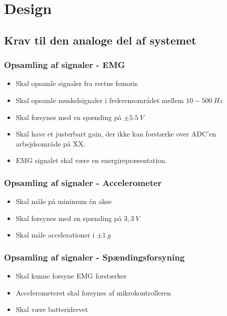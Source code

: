 \section{Design}

\subsection{Krav til den analoge del af systemet}

\subsubsection{Opsamling af signaler - EMG}
\begin{itemize}
\item Skal opsamle signaler fra rectus femoris
\item Skal opsamle muskelsignaler i frekvensområdet mellem $10-500~Hz$
\item Skal forsynes med en spænding på $\pm5.5~V$ 
\item Skal have et justerbart gain, der ikke kan forstærke over ADC'en arbejdsområde på XX.
\item EMG signalet skal være en energirepræsentation.
\end{itemize}

\subsubsection{Opsamling af signaler - Accelerometer}
\begin{itemize}
\item Skal måle på minimum én akse
\item Skal forsynes med en spænding på $3,3~V$
\item Skal måle accelerationer i $\pm1~g$
\end{itemize}

\subsubsection{Opsamling af signaler - Spændingsforsyning}
\begin{itemize} 
\item Skal kunne forsyne EMG forstærker
\item Accelerometeret skal forsynes af mikrokontrolleren
\item Skal være batteridrevet 
\end{itemize}

